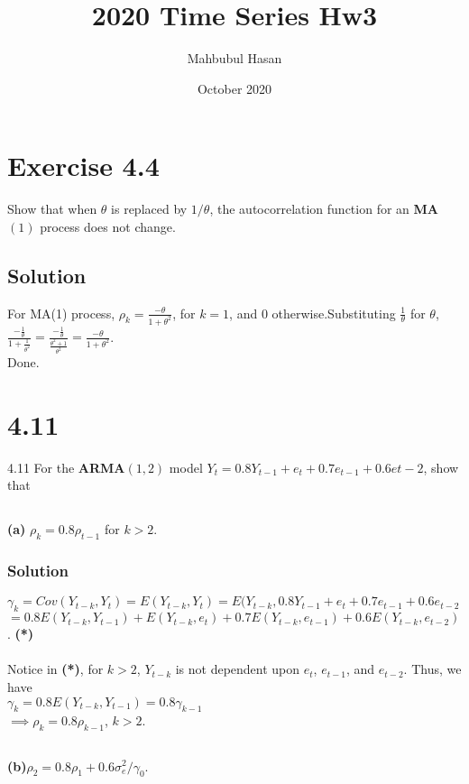\documentclass{article}
\title{2020 Time Series Hw3}
\author{Mahbubul Hasan}
\date{October 2020}
\begin{document}
\maketitle

\section*{Exercise 4.4}
Show that when $\theta$ is replaced by $1/\theta$, the autocorrelation function for an \textbf{MA}$(1)$ process does not change.

\subsection*{Solution}
For MA(1) process, $\rho_k= \frac{-\theta}{1 + \theta^2}$, for $k=1$, and $0$ otherwise.Substituting $\frac{1}{\theta}$ for $\theta$,\\
$\frac{-\frac{1}{\theta}}{1 + \frac{1}{\theta^2}} = \frac{-\frac{1}{\theta}}{\frac{\theta^2 + 1}{\theta^2}} = \frac{-\theta}{1 + \theta^2}$.\\
Done.

\section*{4.11}
4.11 For the \textbf{ARMA}$(1,2)$ model $Y_t = 0.8Y_{t-1} + e_t + 0.7e_{t-1} + 0.6e{t-2}$, show that
\subsection*{}
\textbf{(a)} $\rho_k = 0.8\rho_{t-1}$ for $k > 2$.
\subsubsection*{Solution}
$\gamma_k = Cov(Y_{t-k}, Y_t) = E(Y_{t-k}, Y_t) = E(Y_{t-k}, 0.8Y_{t-1} + e_t + 0.7e_{t-1} + 0.6e_{t-2}$\\ $= 0.8E(Y_{t-k}, Y_{t-1}) + E(Y_{t-k}, e_t) + 0.7E(Y_{t-k},e_{t-1}) + 0.6E(Y_{t-k}, e_{t-2})$.  \textbf{(*)}\\
\\
Notice in \textbf{(*)}, for $k >2$, $Y_{t-k}$ is not dependent upon $e_t$, $e_{t-1}$, and $e_{t-2}$. Thus, we have\\
$\gamma_k = 0.8E(Y_{t-k}, Y_{t-1}) = 0.8\gamma_{k-1}$\\
$\implies \rho_k = 0.8\rho_{k-1}$, $k > 2$.
\subsection*{}
\textbf{(b)}$\rho_2 = 0.8\rho_1 + 0.6 \sigma_{e}^{2}/\gamma_0$.
\end{document}
